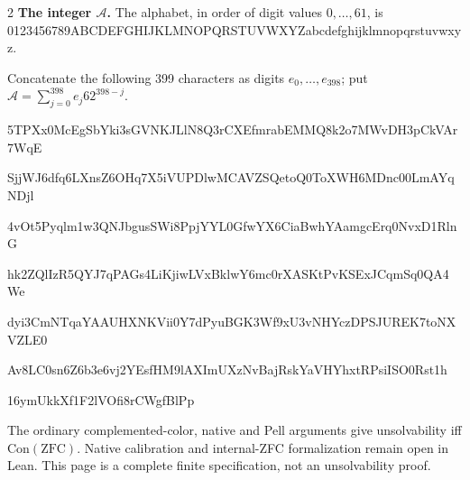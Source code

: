\documentclass[10pt]{article}
\begin{document}
\begin{multicols}{2}
\textbf{The integer $\mathcal A$.}
The alphabet, in order of digit values $0,\ldots,61$, is
{\fontsize{7.7}{8.2}\selectfont\ttfamily 0123456789ABCDEFGHIJKLMNOPQRSTUVWXYZabcdefghijklmnopqrstuvwxyz}.\par
Concatenate the following 399 characters as digits $e_0,\ldots,e_{398}$;
put $\mathcal A=\sum_{j=0}^{398}e_j62^{398-j}$.\par
\begingroup\fontsize{7.7}{8.2}\selectfont\ttfamily
5TPXx0McEgSbYki3sGVNKJLlN8Q3rCXEfmrabEMMQ8k2o7MWvDH3pCkVAr7WqE\par
SjjWJ6dfq6LXnsZ6OHq7X5iVUPDlwMCAVZSQetoQ0ToXWH6MDnc00LmAYqNDjl\par
4vOt5Pyqlm1w3QNJbgusSWi8PpjYYL0GfwYX6CiaBwhYAamgcErq0NvxD1RlnG\par
hk2ZQlIzR5QYJ7qPAGs4LiKjiwLVxBklwY6mc0rXASKtPvKSExJCqmSq0QA4We\par
dyi3CmNTqaYAAUHXNKVii0Y7dPyuBGK3Wf9xU3vNHYczDPSJUREK7toNXVZLE0\par
Av8LC0sn6Z6b3e6vj2YEsfHM9lAXImUXzNvBajRskYaVHYhxtRPsiISO0Rst1h\par
16ymUkkXf1F2lVOfi8rCWgfBlPp\par
\endgroup
\normalfont\fontsize{7.7}{8.2}\selectfont
The ordinary complemented-color, native and Pell arguments give
unsolvability iff $\mathrm{Con}(\mathrm{ZFC})$.
Native calibration and internal-ZFC formalization remain open in Lean.
This page is a complete finite specification, not an unsolvability proof.
\end{multicols}
\end{document}
